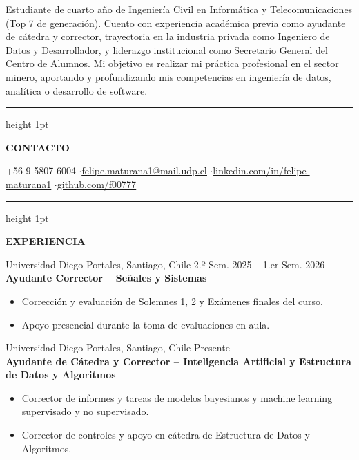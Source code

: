 \documentclass[10pt,a4paper]{article}
\newcommand{\cvsection}[1]{
    \vspace{1em}
    \hrule height 1pt
    \vspace{0.4em}
    \begin{center}
        \textbf{\large #1}
    \end{center}
    \vspace{-0.5em}
}
\begin{document}
\pagestyle{empty}

\begin{center}
    \noindent{}
\end{center}


\vspace{0.3em}
Estudiante de cuarto año de Ingeniería Civil en Informática y Telecomunicaciones (Top 7 de generación). Cuento con experiencia académica previa como ayudante de cátedra y corrector, trayectoria en la industria privada como Ingeniero de Datos y Desarrollador, y liderazgo institucional como Secretario General del Centro de Alumnos. Mi objetivo es realizar mi práctica profesional en el sector minero, aportando y profundizando mis competencias en ingeniería de datos, analítica o desarrollo de software.

\cvsection{CONTACTO}
\begin{center}
    \small +56 9 5807 6004 \enspace$\cdot$\enspace \href{mailto:felipe.maturana1@mail.udp.cl}{\underline{felipe.maturana1@mail.udp.cl}} \enspace$\cdot$\enspace \href{https://www.linkedin.com/in/felipe-maturana1}{\underline{linkedin.com/in/felipe-maturana1}} \enspace$\cdot$\enspace \href{https://github.com/f00777}{\underline{github.com/f00777}}
\end{center}

\cvsection{EXPERIENCIA}

\noindent Universidad Diego Portales, Santiago, Chile \hfill 2.º Sem. 2025 – 1.er Sem. 2026\\[0.2em]
\textbf{Ayudante Corrector – Señales y Sistemas}
\vspace{-0.3em}
\begin{itemize}[leftmargin=1.5em, itemsep=2pt, parsep=0pt]
    \item Corrección y evaluación de Solemnes 1, 2 y Exámenes finales del curso.
    \item Apoyo presencial durante la toma de evaluaciones en aula.
\end{itemize}

\vspace{0.8em}
\noindent Universidad Diego Portales, Santiago, Chile \hfill Presente\\[0.2em]
\textbf{Ayudante de Cátedra y Corrector – Inteligencia Artificial y Estructura de Datos y Algoritmos}
\vspace{-0.3em}
\begin{itemize}[leftmargin=1.5em, itemsep=2pt, parsep=0pt]
    \item Corrector de informes y tareas de modelos bayesianos y machine learning supervisado y no supervisado.
    \item Corrector de controles y apoyo en cátedra de Estructura de Datos y Algoritmos.
\end{itemize}
\end{document}
